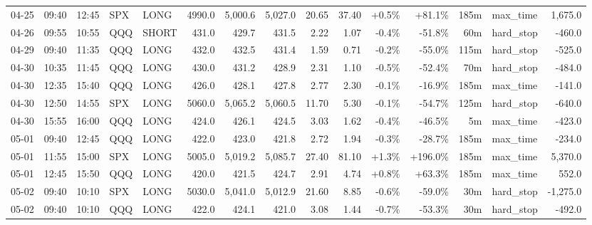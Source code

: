 \documentclass[11pt,a4paper,twoside]{article}
\begin{document}
\begin{landscape}
\begin{center}
\begin{longtable}{>{\color{txtmain}}l l l l l r r r r r r r r >{\color{txtmain}}l r}
04-25 & 09:40 & 12:45 & SPX & LONG & 4990.0 & 5,000.6 & 5,027.0 & 20.65 & 37.40 & \textcolor{wingreen}{+0.5\%} & \textcolor{wingreen}{+81.1\%} & 185m & max\_time & \textcolor{wingreen}{1,675.0} \\
04-26 & 09:55 & 10:55 & QQQ & SHORT & 431.0 & 429.7 & 431.5 & 2.22 & 1.07 & \textcolor{lossred}{-0.4\%} & \textcolor{lossred}{-51.8\%} & 60m & hard\_stop & \textcolor{lossred}{-460.0} \\
04-29 & 09:40 & 11:35 & QQQ & LONG & 432.0 & 432.5 & 431.4 & 1.59 & 0.71 & \textcolor{lossred}{-0.2\%} & \textcolor{lossred}{-55.0\%} & 115m & hard\_stop & \textcolor{lossred}{-525.0} \\
04-30 & 10:35 & 11:45 & QQQ & LONG & 430.0 & 431.2 & 428.9 & 2.31 & 1.10 & \textcolor{lossred}{-0.5\%} & \textcolor{lossred}{-52.4\%} & 70m & hard\_stop & \textcolor{lossred}{-484.0} \\
04-30 & 12:35 & 15:40 & QQQ & LONG & 426.0 & 428.1 & 427.8 & 2.77 & 2.30 & \textcolor{lossred}{-0.1\%} & \textcolor{lossred}{-16.9\%} & 185m & max\_time & \textcolor{lossred}{-141.0} \\
04-30 & 12:50 & 14:55 & SPX & LONG & 5060.0 & 5,065.2 & 5,060.5 & 11.70 & 5.30 & \textcolor{lossred}{-0.1\%} & \textcolor{lossred}{-54.7\%} & 125m & hard\_stop & \textcolor{lossred}{-640.0} \\
04-30 & 15:55 & 16:00 & QQQ & LONG & 424.0 & 426.1 & 424.5 & 3.03 & 1.62 & \textcolor{lossred}{-0.4\%} & \textcolor{lossred}{-46.5\%} & 5m & max\_time & \textcolor{lossred}{-423.0} \\
05-01 & 09:40 & 12:45 & QQQ & LONG & 422.0 & 423.0 & 421.8 & 2.72 & 1.94 & \textcolor{lossred}{-0.3\%} & \textcolor{lossred}{-28.7\%} & 185m & max\_time & \textcolor{lossred}{-234.0} \\
05-01 & 11:55 & 15:00 & SPX & LONG & 5005.0 & 5,019.2 & 5,085.7 & 27.40 & 81.10 & \textcolor{wingreen}{+1.3\%} & \textcolor{wingreen}{+196.0\%} & 185m & max\_time & \textcolor{wingreen}{5,370.0} \\
05-01 & 12:45 & 15:50 & QQQ & LONG & 420.0 & 421.5 & 424.7 & 2.91 & 4.74 & \textcolor{wingreen}{+0.8\%} & \textcolor{wingreen}{+63.3\%} & 185m & max\_time & \textcolor{wingreen}{552.0} \\
05-02 & 09:40 & 10:10 & SPX & LONG & 5030.0 & 5,041.0 & 5,012.9 & 21.60 & 8.85 & \textcolor{lossred}{-0.6\%} & \textcolor{lossred}{-59.0\%} & 30m & hard\_stop & \textcolor{lossred}{-1,275.0} \\
05-02 & 09:40 & 10:10 & QQQ & LONG & 422.0 & 424.1 & 421.0 & 3.08 & 1.44 & \textcolor{lossred}{-0.7\%} & \textcolor{lossred}{-53.3\%} & 30m & hard\_stop & \textcolor{lossred}{-492.0} \\

\end{longtable}
\end{center}
\end{landscape}
\end{document}
